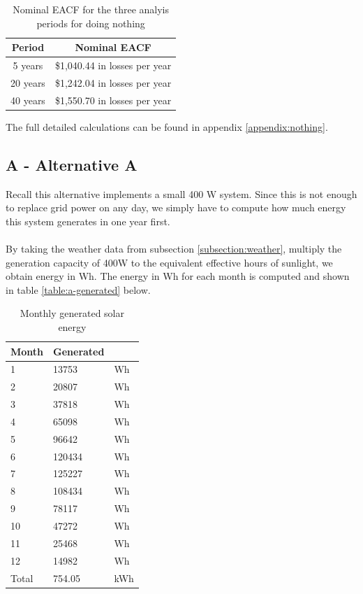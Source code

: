 \documentclass[10pt,letterpaper]{article}
\begin{document}
\begin{table}[H]
	\centering
	\begin{tabular}{|c|c|}
		\hline
		Period   & Nominal EACF           \\
		\hline
		5 years  & \$1,040.44  in losses per year  \\
		20 years & \$1,242.04  in losses per year \\
		40 years & \$1,550.70  in losses per year \\
		\hline
	\end{tabular}
	\caption{Nominal EACF for the three analyis periods for doing nothing}
	\label{table:eacf-nothing}
\end{table}

The full detailed calculations can be found in appendix \ref{appendix:nothing}.\\

\subsection{A - Alternative A}

Recall this alternative implements a small 400 W system. Since this is not enough to replace grid power on any day, we simply have to compute how much energy this system generates in one year first.\\
\\
By taking the weather data from subsection \ref{subsection:weather}, multiply the generation capacity of 400W to the equivalent effective hours of sunlight, we obtain energy in Wh. The energy in Wh for each month is computed and shown in table \ref{table:a-generated} below.

\begin{table}[H]
	\centering
	\begin{tabular}{|l|l l|}
		\hline
		Month & Generated &     \\ \hline
		1     & 13753     & Wh  \\
		2     & 20807     & Wh  \\
		3     & 37818     & Wh  \\
		4     & 65098     & Wh  \\
		5     & 96642     & Wh  \\
		6     & 120434    & Wh  \\
		7     & 125227    & Wh  \\
		8     & 108434    & Wh  \\
		9     & 78117     & Wh  \\
		10    & 47272     & Wh  \\
		11    & 25468     & Wh  \\
		12    & 14982     & Wh  \\ \hline
		Total & 754.05    & kWh \\ \hline
	\end{tabular}
	\caption{Monthly generated solar energy}
	\label{table;a-generated}
\end{table}
\end{document}
